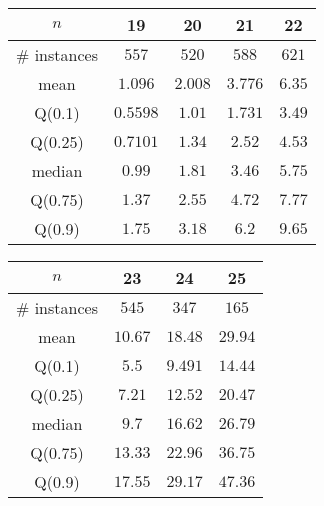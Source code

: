 \begin{tabular}{c|cccc} 
\hline 
$n$ & 19 & 20 & 21 & 22 \tabularnewline 
\hline 
\hline 
\# instances & $557$ & $520$ & $588$ & $621$ \tabularnewline 
mean & $1.096$ & $2.008$ & $3.776$ & $6.35$ \tabularnewline 
Q(0.1) & $0.5598$ & $1.01$ & $1.731$ & $3.49$ \tabularnewline 
Q(0.25) & $0.7101$ & $1.34$ & $2.52$ & $4.53$ \tabularnewline 
median & $0.99$ & $1.81$ & $3.46$ & $5.75$ \tabularnewline 
Q(0.75) & $1.37$ & $2.55$ & $4.72$ & $7.77$ \tabularnewline 
Q(0.9) & $1.75$ & $3.18$ & $6.2$ & $9.65$ \tabularnewline 
\hline 
\end{tabular} 
\medskip{} 

\begin{tabular}{c|ccc} 
\hline 
$n$ & 23 & 24 & 25 \tabularnewline 
\hline 
\hline 
\# instances & $545$ & $347$ & $165$ \tabularnewline 
mean & $10.67$ & $18.48$ & $29.94$ \tabularnewline 
Q(0.1) & $5.5$ & $9.491$ & $14.44$ \tabularnewline 
Q(0.25) & $7.21$ & $12.52$ & $20.47$ \tabularnewline 
median & $9.7$ & $16.62$ & $26.79$ \tabularnewline 
Q(0.75) & $13.33$ & $22.96$ & $36.75$ \tabularnewline 
Q(0.9) & $17.55$ & $29.17$ & $47.36$ \tabularnewline 
\hline 
\end{tabular} 
\medskip{} 

